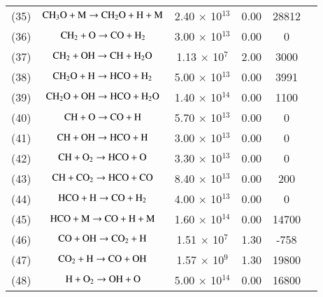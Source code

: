 \documentclass{warpdoc}
\begin{document}
\begin{table}[h]
\begin{center}
\begin{threeparttable}
\begin{tabular}{cccccc}
(35) & $\rm C H_3 O + M \rightarrow C H_2 O  + H + M $ &2.40 $\times$ 10$^{13}$  & 0.00 &28812&\cite{rkm:1991:smoke}\\ 

(36) & $\rm C H_2 + O \rightarrow CO + H_2 $ &3.00 $\times$ 10$^{13}$  & 0.00 & 0 &\cite{comb:2010:glassman}\\ 

(37) & $\rm C H_2 + OH \rightarrow CH + H_2 O$ &1.13 $\times$ 10$^{7}$  & 2.00 & 3000 &\cite{comb:2010:glassman}\\ 

(38) & $\rm C H_2 O + H \rightarrow HCO + H_2 $ &5.00 $\times$ 10$^{13}$  & 0.00 & 3991 &\cite{rkm:1991:smoke}\\ 

(39) & $\rm C H_2 O + OH \rightarrow HCO + H_2 O $ &1.40 $\times$ 10$^{14}$  & 0.00 & 1100 &\cite{rkm:1991:smoke}\\

(40) & $\rm CH  + O \rightarrow CO+H $ &5.70 $\times$ 10$^{13}$  & 0.00 &0&\cite{comb:2010:glassman}\\

(41) & $\rm CH  + OH \rightarrow HCO+H $ &3.00 $\times$ 10$^{13}$  & 0.00 &0&\cite{comb:2010:glassman}\\

(42) & $\rm CH  + O_2 \rightarrow HCO+O $ &3.30 $\times$ 10$^{13}$  & 0.00 &0&\cite{comb:2010:glassman}\\

(43) & $\rm CH  +  C O_2 \rightarrow HCO+CO $ &8.40 $\times$ 10$^{13}$  & 0.00 &200&\cite{comb:2010:glassman}\\

(44) & $\rm HCO  +  H \rightarrow CO + H_2 $ &4.00 $\times$ 10$^{13}$  & 0.00 &0&\cite{rkm:1991:smoke}\\

(45) & $\rm HCO  +  M \rightarrow CO + H + M $ &1.60 $\times$ 10$^{14}$  & 0.00 &14700&\cite{rkm:1991:smoke}\\
(46) & $\rm CO + OH \rightarrow C O_2 + H $ &1.51 $\times$ 10$^{7}$  & 1.30 &-758&\cite{rkm:1991:smoke}\\

(47) & $\rm C O_2 + H \rightarrow CO + OH $ &1.57 $\times$ 10$^{9}$  & 1.30 &19800&\cite{rkm:1991:smoke}\\

(48) & $\rm H + O_2 \rightarrow OH +O $ &5.00 $\times$ 10$^{14}$  & 0.00 &16800&\cite{rkm:1991:smoke}\\


\end{tabular}
\end{threeparttable}
\end{center}
\end{table}
\end{document}
